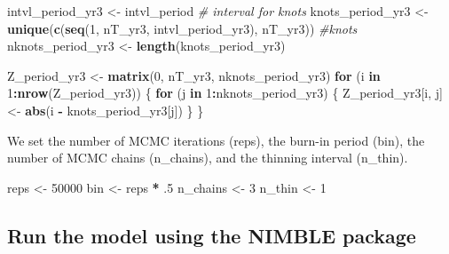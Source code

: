 \documentclass[11pt,]{article}
\newenvironment{Shaded}{\begin{snugshade}}{\end{snugshade}}
\newcommand{\KeywordTok}[1]{\textcolor[rgb]{0.13,0.29,0.53}{\textbf{#1}}}
\newcommand{\DecValTok}[1]{\textcolor[rgb]{0.00,0.00,0.81}{#1}}
\newcommand{\StringTok}[1]{\textcolor[rgb]{0.31,0.60,0.02}{#1}}
\newcommand{\CommentTok}[1]{\textcolor[rgb]{0.56,0.35,0.01}{\textit{#1}}}
\newcommand{\ControlFlowTok}[1]{\textcolor[rgb]{0.13,0.29,0.53}{\textbf{#1}}}
\newcommand{\OperatorTok}[1]{\textcolor[rgb]{0.81,0.36,0.00}{\textbf{#1}}}
\newcommand{\NormalTok}[1]{#1}
\begin{document}
\begin{Shaded}
\begin{Highlighting}[]
\NormalTok{intvl_period_yr3 <-}\StringTok{ }\NormalTok{intvl_period }\CommentTok{# interval for knots}
\NormalTok{knots_period_yr3 <-}\StringTok{ }\KeywordTok{unique}\NormalTok{(}\KeywordTok{c}\NormalTok{(}\KeywordTok{seq}\NormalTok{(}\DecValTok{1}\NormalTok{,}
\NormalTok{                                 nT_yr3,}
\NormalTok{                                 intvl_period_yr3),}
\NormalTok{                             nT_yr3)) }\CommentTok{#knots}
\NormalTok{nknots_period_yr3 <-}\StringTok{ }\KeywordTok{length}\NormalTok{(knots_period_yr3)}

\NormalTok{Z_period_yr3 <-}\StringTok{ }\KeywordTok{matrix}\NormalTok{(}\DecValTok{0}\NormalTok{, nT_yr3, nknots_period_yr3)}
\ControlFlowTok{for}\NormalTok{ (i }\ControlFlowTok{in} \DecValTok{1}\OperatorTok{:}\KeywordTok{nrow}\NormalTok{(Z_period_yr3)) \{}
  \ControlFlowTok{for}\NormalTok{ (j }\ControlFlowTok{in} \DecValTok{1}\OperatorTok{:}\NormalTok{nknots_period_yr3) \{}
\NormalTok{    Z_period_yr3[i, j] <-}\StringTok{ }\KeywordTok{abs}\NormalTok{(i }\OperatorTok{-}\StringTok{ }\NormalTok{knots_period_yr3[j])}
\NormalTok{  \}}
\NormalTok{\}}
\end{Highlighting}
\end{Shaded}

We set the number of MCMC iterations (reps), the burn-in period (bin),
the number of MCMC chains (n\_chains), and the thinning interval
(n\_thin).

\begin{Shaded}
\begin{Highlighting}[]
\NormalTok{reps <-}\StringTok{ }\DecValTok{50000}
\NormalTok{bin <-}\StringTok{ }\NormalTok{reps }\OperatorTok{*}\StringTok{ }\NormalTok{.}\DecValTok{5}
\NormalTok{n_chains <-}\StringTok{ }\DecValTok{3}
\NormalTok{n_thin <-}\StringTok{ }\DecValTok{1}
\end{Highlighting}
\end{Shaded}

\subsection{Run the model using the NIMBLE
package}\label{run-the-model-using-the-nimble-package}
\end{document}
